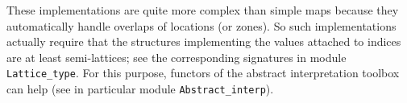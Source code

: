 These implementations are quite more complex than simple maps because they
automatically handle overlaps of locations (or zones). So such implementations
actually require that the structures implementing the values attached to indices
are at least semi-lattices; see the corresponding signatures
in module \texttt{Lattice\_type}. For
this purpose, functors of the abstract interpretation toolbox%
 can help (see in particular module
\texttt{Abstract\_interp}).









